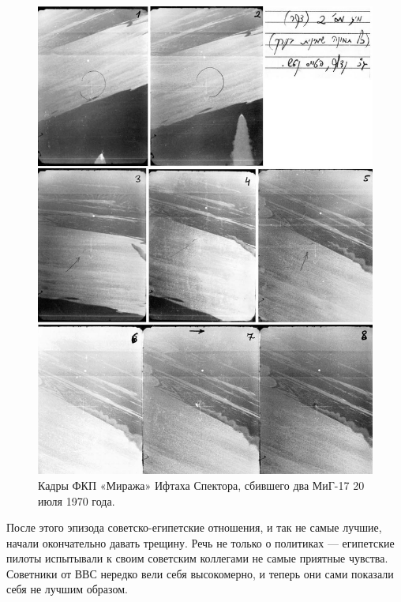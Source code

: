 \begin{figure}[h!tb] 
	\centering\includegraphics[scale=0.4]{Dolina_4/DPeAH3iJCp8.jpg}
	\caption{Кадры ФКП «Миража» Ифтаха Спектора, сбившего два МиГ-17 20 июля 1970 года.}%
\end{figure}

После этого эпизода советско-египетские отношения, и так не самые лучшие, начали окончательно давать трещину. Речь не только о политиках — египетские пилоты испытывали к своим советским коллегами не самые приятные чувства. Советники от ВВС нередко вели себя высокомерно, и теперь они сами показали себя не лучшим образом.

